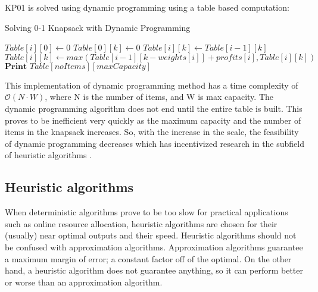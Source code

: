 \documentclass[titlepage]{article}
\begin{document}
KP01 is solved using dynamic programming using a table based computation:

\begin{breakablealgorithm}
\caption{Solving 0-1 Knapsack with Dynamic Programming}\label{dp}
    \begin{algorithmic}[1]
         \Comment{\textcolor{blue}{If no items, then profit = 0}}
            \State $Table[i][0] \gets 0 $ 
        \EndFor
         \Comment{\textcolor{blue}{If no capacity, then profit = 0}}
            \State $Table[0][k] \gets 0 $
        \EndFor
                \State $Table[i][k] \gets Table[i-1][k]$  
                    \State $Table[i][k] \gets max(Table[i-1][k-weights[i]] + profits[i], Table[i][k]) $
                \EndIf
            \EndFor
        \EndFor
        \State $\textbf{Print } Table[noItems][maxCapacity] $
    \end{algorithmic}
\end{breakablealgorithm}

\vskip 0.5cm

This implementation of dynamic programming method has a time complexity of $\mathcal{O}(N\cdot W)$, where N is the number of items, and W is max capacity. The dynamic programming algorithm does not end until the entire table is built. This proves to be inefficient very quickly as the maximum capacity and the number of items in the knapsack increases. So, with the increase in the scale, the feasibility of dynamic programming decreases which has incentivized research in the subfield of heuristic algorithms \cite{QWPA}. 

\subsection*{Heuristic algorithms}
When deterministic algorithms prove to be too slow for practical applications such as online resource allocation, heuristic algorithms are chosen for their (usually) near optimal outputs and their speed. Heuristic algorithms should not be confused with approximation algorithms. Approximation algorithms guarantee a maximum margin of error; a constant factor off of the optimal. On the other hand, a heuristic algorithm does not guarantee anything, so it can perform better or worse than an approximation algorithm. 
\end{document}
